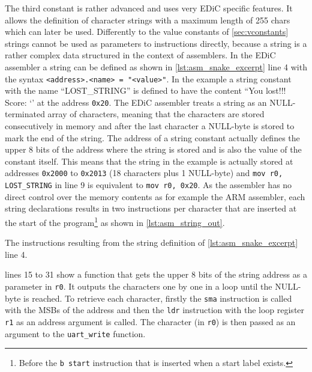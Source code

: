 The third constant is rather advanced and uses very \gls{EDiC} specific features.
It allows the definition of character strings with a maximum length of 255 chars which can later be used.
Differently to the value constants of \cref{sec:vconstants} strings cannot be used as parameters to instructions directly, because a string is a rather complex data structured in the context of assemblers.
In the \gls{EDiC} assembler a string can be defined as shown in \cref{lst:asm_snake_excerpt} line 4 with the syntax \texttt{<address>.<name> = "<value>"}.
In the example a string constant with the name ``LOST\_STRING'' is defined to have the content ``You lost!!! Score: `' at the address \texttt{0x20}.
The \gls{EDiC} assembler treats a string as an NULL-terminated array of characters, meaning that the characters are stored consecutively in memory and after the last character a NULL-byte is stored to mark the end of the string.
The address of a string constant actually defines the upper 8 bits of the address where the string is stored and is also the value of the constant itself.
This means that the string in the example is actually stored at addresses \texttt{0x2000} to \texttt{0x2013} (18 characters plus 1 NULL-byte) and \texttt{mov r0, LOST_STRING} in line 9 is equivalent to \texttt{mov r0, 0x20}.
As the assembler has no direct control over the memory contents as for example the ARM assembler, each string declarations results in two instructions per character that are inserted at the start of the program\footnote{Before the \texttt{b start} instruction that is inserted when a start label exists.} as shown in \cref{lst:asm_string_out}.

\begin{listing}[t]
  \caption{The instructions resulting from the string definition of \cref{lst:asm_snake_excerpt} line 4.}
  \label{lst:asm_string_out}
\end{listing}
 lines 15 to 31 show a function that gets the upper 8 bits of the string address as a parameter in \texttt{r0}.
It outputs the characters one by one in a loop until the NULL-byte is reached.
To retrieve each character, firstly the \texttt{sma} instruction is called with the \glspl{MSB} of the address and then the \texttt{ldr} instruction with the loop register \texttt{r1} as an address argument is called.
The character (in \texttt{r0}) is then passed as an argument to the \texttt{uart\_write} function.

